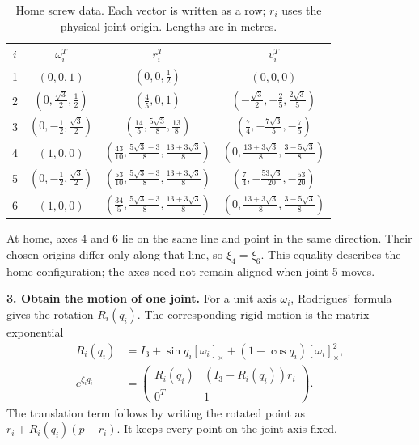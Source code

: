 \begin{table}[!ht]
\centering
\caption{Home screw data. Each vector is written as a row; $r_i$ uses the physical
joint origin. Lengths are in metres.}
\label{tab:poe-screws}
\small
\setlength{\tabcolsep}{5pt}
\renewcommand{\arraystretch}{1.55}
\begin{tabular}{@{}c c c c@{}}
\toprule
$i$ & $\omega_i^T$ & $r_i^T$ & $v_i^T$ \\
\midrule
1 & $(0,0,1)$ & $(0,0,\tfrac12)$ & $(0,0,0)$ \\
2 & $(0,\tfrac{\sqrt3}{2},\tfrac12)$ & $(\tfrac45,0,1)$
  & $(-\tfrac{\sqrt3}{2},-\tfrac25,\tfrac{2\sqrt3}{5})$ \\
3 & $(0,-\tfrac12,\tfrac{\sqrt3}{2})$ & $(\tfrac{14}{5},\tfrac{5\sqrt3}{8},\tfrac{13}{8})$
  & $(\tfrac74,-\tfrac{7\sqrt3}{5},-\tfrac75)$ \\
4 & $(1,0,0)$ & $(\tfrac{43}{10},\tfrac{5\sqrt3-3}{8},\tfrac{13+3\sqrt3}{8})$
  & $(0,\tfrac{13+3\sqrt3}{8},\tfrac{3-5\sqrt3}{8})$ \\
5 & $(0,-\tfrac12,\tfrac{\sqrt3}{2})$
  & $(\tfrac{53}{10},\tfrac{5\sqrt3-3}{8},\tfrac{13+3\sqrt3}{8})$
  & $(\tfrac74,-\tfrac{53\sqrt3}{20},-\tfrac{53}{20})$ \\
6 & $(1,0,0)$ & $(\tfrac{34}{5},\tfrac{5\sqrt3-3}{8},\tfrac{13+3\sqrt3}{8})$
  & $(0,\tfrac{13+3\sqrt3}{8},\tfrac{3-5\sqrt3}{8})$ \\
\bottomrule
\end{tabular}
\end{table}

At home, axes 4 and 6 lie on the same line and point in the same direction.
Their chosen origins differ only along that line, so $\xi_4=\xi_6$.
This equality describes the home configuration; the axes need not remain
aligned when joint 5 moves.

\textbf{3. Obtain the motion of one joint.}
For a unit axis $\omega_i$, Rodrigues' formula gives the rotation $R_i(q_i)$.
The corresponding rigid motion is the matrix exponential
\begin{equation}
 \begin{aligned}
 R_i(q_i)&=I_3+\sin q_i[\omega_i]_\times
                 +(1-\cos q_i)[\omega_i]_\times^2,\\
 e^{\widehat\xi_i q_i}
 &=\begin{pmatrix}
 R_i(q_i)&(I_3-R_i(q_i))r_i\\0^T&1
 \end{pmatrix}.
 \end{aligned}
 \label{eq:poe-exponential}
\end{equation}
The translation term follows by writing the rotated point as
$r_i+R_i(q_i)(p-r_i)$. It keeps every point on the joint axis fixed.

